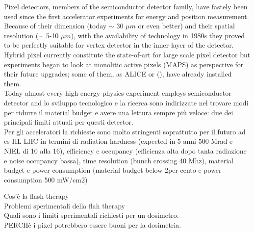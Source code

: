 Pixel detectors, members of the semiconductor detector family, have fastely been used since the first 
accelerator experiments for energy and position measurement. 
Because of their dimension (today $\sim$ 30 $\mu m$ or even better) and their spatial resolution 
\cite{einstein}
($\sim$ 5-10 $\mu m$), with the availability of technology in 1980s they proved to be perfectly suitable 
for vertex detector in the inner layer of the detector.\\
Hybrid pixel currently constitute the state-of-art for large scale pixel detector but experiments began to look at monolitic active pixels (MAPS) as perspective for their future upgrades; some of them, as ALICE or 
(), have already installed them. \\

Today almost every high energy physics experiment employs semiconductor detector and 
lo sviluppo tecnologico e la ricerca sono indirizzate nel trovare modi per ridurre il material budget e
avere una lettura sempre più veloce: due dei principali limiti attuali per questi detector. \\

Per gli acceleratori la richieste sono molto stringenti soprattutto per il futuro ad es HL LHC in termini di radiation hardness (expected in 5 anni 500 Mrad e NIEL di 10 alla 16), efficiency e occupancy (efficienza alta dopo tanta radiazione e noise occupancy bassa), time resolution (bunch crossing 40 Mhz), material budget e power consumption (material budget below 2per cento e power consumption 500 mW/cm2)

Cos'è la flash therapy\\
Problemi sperimentali della flah therapy\\
Quali sono i limiti sperimentali richiesti per un dosimetro.\\
PERCHè i pixel potrebbero essere buoni per la dosimetria.\\


